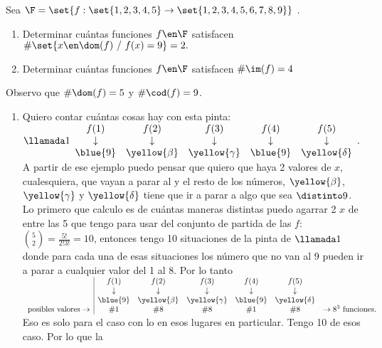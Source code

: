 \ejExtra

Sea
$\F = \set{f: \set{1,2,3,4,5} \to \set{1,2,3,4,5,6,7,8,9}}$ .

\begin{enumerate}[label=\alph*)]
  \item Determinar cuántas funciones
        $f \en \F$ satisfacen $\# \set{x \en \dom(f)\ / \ f(x) = 9} = 2.$

  \item Determinar cuántas funciones
        $f \en \F$ satisfacen $\#\im(f) = 4$
\end{enumerate}

\separadorCorto


Observo que $\#\dom(f) = 5$ y $\#\cod(f) = 9$.

\begin{enumerate}[label=\alph*)]
  \item  Quiero contar cuántas cosas hay con esta pinta:
        $\llamada1
          \begin{array}{ccccc}
            f(1)       & f(2)           & f(3)            & f(4)       & f(5)            \\
            \downarrow & \downarrow     & \downarrow      & \downarrow & \downarrow      \\
            \blue{9}   & \yellow{\beta} & \yellow{\gamma} & \blue{9}   & \yellow{\delta}
          \end{array}.
        $\\
        A partir de ese ejemplo puedo pensar que quiero que haya 2 valores de $x$, cualesquiera, que vayan a
        parar al  y el resto de los números, $\yellow{\beta}$, $\yellow{\gamma}$ y $\yellow{\delta}$
        tiene que ir a parar a algo que sea $\distinto 9$.\\
        Lo primero que calculo es de cuántas maneras distintas puedo agarrar 2 $x$ de entre las 5 que tengo
        para usar del conjunto de partida de las $f$:
        $\binom{5}{2} = \frac{5!}{2!3!} = 10$, entonces tengo 10 situaciones de la pinta de $\llamada1$ donde para
        cada una de esas situaciones los número que no van al 9 pueden ir a parar a cualquier valor del 1 al 8. Por lo tanto
        $\begin{array}{c|cccccc}
                                       & f(1)       & f(2)           & f(3)            & f(4)       & f(5)            &                            \\
                                       & \downarrow & \downarrow     & \downarrow      & \downarrow & \downarrow      &                            \\
                                       & \blue{9}   & \yellow{\beta} & \yellow{\gamma} & \blue{9}   & \yellow{\delta} &                            \\
            \text{posibles valores}\to & \#1        & \#8            & \#8             & \#1        & \#8             & \to 8^3 \text{ funciones}.
          \end{array}\\
        $
        Eso es solo para el caso con lo  en esos lugares en particular. Tengo 10 de esos caso. Por lo que la



\end{enumerate}
